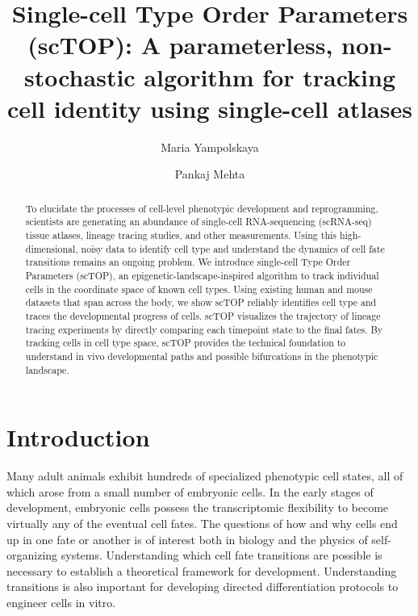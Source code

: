 \documentclass[aps,superscriptaddress, notitlepage,longbibliography]{revtex4-1}
\begin{document}
\title{Single-cell Type Order Parameters (scTOP): A parameterless, non-stochastic algorithm for tracking cell identity using single-cell atlases}

\author{Maria Yampolskaya}

\author{Pankaj Mehta}


\begin{abstract}
To elucidate the processes of cell-level phenotypic development and reprogramming, scientists are generating an abundance of single-cell RNA-sequencing (scRNA-seq) tissue atlases, lineage tracing studies, and other measurements. Using this high-dimensional, noisy data to identify cell type and understand the dynamics of cell fate transitions remains an ongoing problem. We introduce single-cell Type Order Parameters (scTOP), an epigenetic-landscape-inspired algorithm to track individual cells in the coordinate space of known cell types. Using existing human and mouse datasets that span across the body, we show scTOP reliably identifies cell type and traces the developmental progress of cells. scTOP visualizes the trajectory of lineage tracing experiments by directly comparing each timepoint state to the final fates. By tracking cells in cell type space, scTOP provides the technical foundation to understand in vivo developmental paths and possible bifurcations in the phenotypic landscape.
\end{abstract}

\maketitle

\section{Introduction}
Many adult animals exhibit hundreds of specialized phenotypic cell states, all of which arose from a small number of embryonic cells. In the early stages of development, embryonic cells possess the transcriptomic flexibility to become virtually any of the eventual cell fates. The questions of how and why cells end up in one fate or another is of interest both in biology and the physics of self-organizing systems. Understanding which cell fate transitions are possible is necessary to establish a theoretical framework for development. Understanding transitions is also important for developing directed differentiation protocols to engineer cells in vitro.
\end{document}

